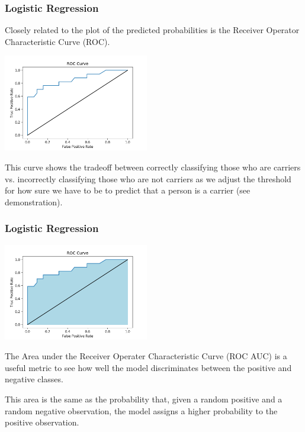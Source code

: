 \documentclass[11pt, table]{beamer}
\begin{document}
\begin{frame}
\frametitle{Logistic Regression}
Closely related to the plot of the predicted probabilities is the Receiver Operator Characteristic Curve (ROC).

\begin{center}
	\includegraphics[width = 2.5in]{images/Dystrophy/roc_01.png}
\end{center}

This curve shows the tradeoff between correctly classifying those who are carriers vs. incorrectly classifying those who are not carriers as we adjust the threshold for how sure we have to be to predict that a person is a carrier (see demonstration).
\end{frame}

\begin{frame}
\frametitle{Logistic Regression}
\begin{center}
	\includegraphics[width = 2.5in]{images/Dystrophy/roc_02.png}
\end{center}

The Area under the Receiver Operater Characteristic Curve (ROC AUC) is a useful metric to see how well the model discriminates between the positive and negative classes.
\vspace{0.1in}

This area is the same as the probability that, given a random positive and a random negative observation, the model assigns a higher probability to the positive observation. 
\end{frame}
\end{document}
